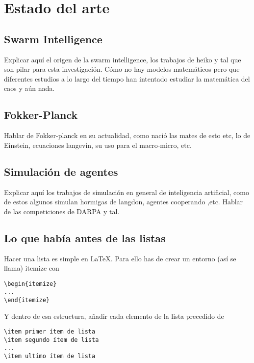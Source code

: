 
\chapter{Estado del arte}
\label{estadoarte}

\section{Swarm Intelligence}
Explicar aquí el origen de la swarm intelligence, los trabajos de heiko y tal que son pilar para esta investigación. Cómo no hay modelos matemáticos pero que diferentes estudios a lo largo del tiempo han intentado estudiar la matemática del caos y aún nada.

\section{Fokker-Planck}
Hablar de Fokker-planck en su actualidad, como nació las mates de esto etc, lo de Einstein, ecuaciones langevin, su uso para el macro-micro, etc.

\section{Simulación de agentes}
Explicar aquí los trabajos de simulación en general de inteligencia artificial, como de estos algunos simulan hormigas de langdon, agentes cooperando ,etc. Hablar de las competiciones de DARPA y tal.


\section{Lo que había antes de las listas}

Hacer una lista es simple en \LaTeX. Para ello has de crear un entorno (así se llama) itemize con
\begin{lstlisting}[style=Latex-color]
\begin{itemize}
...
\end{itemize}
\end{lstlisting}
Y dentro de esa estructura, añadir cada elemento de la lista precedido de 
\begin{lstlisting}[style=Latex-color]
\item primer ítem de lista
\item segundo ítem de lista
...
\item ultimo ítem de lista
\end{lstlisting}

